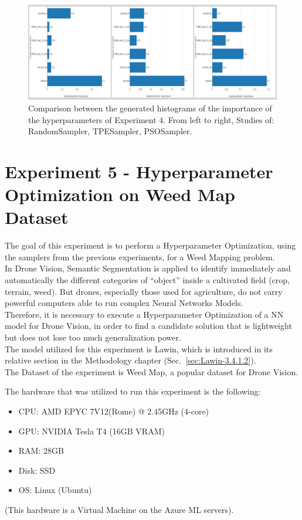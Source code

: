 \begin{figure}[t]
	\centering
	\includegraphics[width=15cm]{figures/figure-4.4.1.png}
	\caption[Hyperparameters Importance Histograms Experiment 4]{Comparison between the generated histograms of the importance of the hyperparameters of Experiment 4. From left to right, Studies of: RandomSampler, TPESampler, PSOSampler.}
	\label{fig:figure-4.4.1}
\end{figure}

\section{Experiment 5 - Hyperparameter Optimization on Weed Map Dataset}

The goal of this experiment is to perform a Hyperparameter Optimization, using the samplers from the previous experiments, for a Weed Mapping problem.
\\[0.3cm]In Drone Vision, Semantic Segmentation is applied to identify immediately and automatically the different categories of “object” inside a cultivated field (crop, terrain, weed). But drones, especially those used for agriculture, do not carry powerful computers able to run complex Neural Networks Models.
\\[0.3cm]Therefore, it is necessary to execute a Hyperparameter Optimization of a NN model for Drone Vision, in order to find a candidate solution that is lightweight but does not lose too much generalization power.
\\[0.3cm]The model utilized for this experiment is Lawin, which is introduced in its relative section in the Methodology chapter (Sec.~\ref{sec:Lawin-3.4.1.2}).
\\[0.3cm]The Dataset of the experiment is Weed Map, a popular dataset for Drone Vision.

The hardware that was utilized to run this experiment is the following:
\begin{itemize}[itemsep=0.1cm]
	\item CPU: AMD EPYC 7V12(Rome) @ 2.45GHz (4-core)
	\item GPU: NVIDIA Tesla T4 (16GB VRAM)
	\item RAM: 28GB
	\item Disk: SSD
	\item OS: Linux (Ubuntu)
\end{itemize}
(This hardware is a Virtual Machine on the Azure ML servers).

